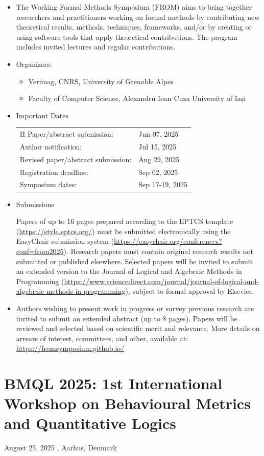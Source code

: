 \documentclass[prodmode,acmtecs]{acmsmall} %
\begin{document}
\begin{itemize}\item  The Working Formal Methods Symposium (FROM) aims to bring together researchers and practitioners working on formal methods by contributing new theoretical results, methods, techniques, frameworks, and/or by creating or using software tools that apply theoretical contributions. The program includes invited lectures and regular contributions. 
 
\item  Organizers: 
 
\begin{itemize}\item  Verimag, CNRS, University of Grenoble Alpes
\item  Faculty of Computer Science, Alexandru Ioan Cuza University of Iași
\end{itemize} 
\item  Important Dates 
 
\begin{tabulary}{\linewidth}{LL}H Paper/abstract submission:  & Jun 07, 2025 \\
Author notification:  & Jul 15, 2025 \\
Revised paper/abstract submission:  & Aug 29, 2025 \\
Registration deadline:  & Sep 02, 2025 \\
Symposium dates:  & Sep 17-19, 2025 \\
\end{tabulary}
 
\item  Submissions 
 
  Papers of up to 16 pages prepared according to the EPTCS template (\href{https://style.eptcs.org/}{https://style.eptcs.org/}) must be submitted electronically using the EasyChair submission system (\href{https://easychair.org/conferences?conf=from2025}{https://easychair.org/conferences?conf=from2025}). Research papers must contain original research results not submitted or published elsewhere. Selected papers will be invited to submit an extended version to the Journal of Logical and Algebraic Methods in Programming (\href{https://www.sciencedirect.com/journal/journal-of-logical-and-algebraic-methods-in-programming}{https://www.sciencedirect.com/journal/journal-of-logical-and-algebraic-methods-in-programming}), subject to formal approval by Elsevier. 
 
\item  Authors wishing to present work in progress or survey previous research are invited to submit an extended abstract (up to 8 pages). Papers will be reviewed and selected based on scientific merit and relevance. More details on arrears of interest, committees, and other, available at: \href{https://fromsymposium.github.io/}{https://fromsymposium.github.io/} 
 
\end{itemize}\section{BMQL 2025: 1st International Workshop on Behavioural Metrics and Quantitative Logics}\label{BMQL2025}  August 25, 2025 , Aarhus, Denmark\\ 
\end{document}
